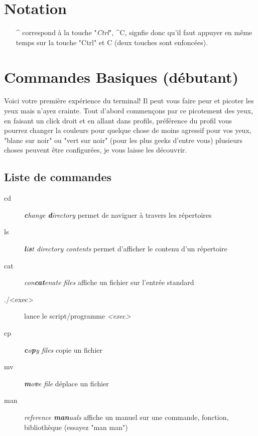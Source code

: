 \documentclass[french, a4paper, 12pt, titlepage]{article}
\begin{document}
\section{Notation}
\begin{enumerate}
\item[\^{}] correspond à la touche "\emph{Ctrl}", \^{}C, signfie donc qu'il faut appuyer en même temps sur la touche "Ctrl" et C (deux touches sont enfoncées).
\end{enumerate}

\section{Commandes Basiques (débutant)}
Voici votre première expérience du terminal!
Il peut vous faire peur et picoter les yeux mais n'ayez crainte. Tout d'abord commençons par ce picotement des yeux, en faisant un click droit et en allant dans profils, préférence du profil vous pourrez changer la couleurs pour quelque chose de moins agressif pour vos yeux, "blanc sur noir" ou "vert sur noir" (pour les plus geeks d'entre vous) plusieurs choses peuvent être configurées, je vous laisse les découvrir.


\subsection{Liste de commandes}
\begin{description}
\item[cd] \emph{\textbf{c}hange \textbf{d}irectory} permet de naviguer à travers les répertoires
\item[ls] \emph{\textbf{l}i\textbf{s}t directory contents} permet d'afficher le contenu d'un répertoire
\item[cat] \emph{con\textbf{cat}enate files} affiche un fichier sur l'entrée standard
\item[./<exec>] lance le script/programme \emph{<exec>}
\item[cp] \emph{\textbf{c}o\textbf{p}y files} copie un fichier
\item[mv] \emph{\textbf{m}o\textbf{v}e file} déplace un fichier
\item[man] \emph{reference \textbf{man}uals} affiche un manuel sur une commande, fonction, bibliothèque (essayez "man man")
\end{description}








\end{document}
